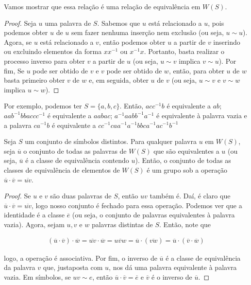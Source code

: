 	\par\vspace{0.3cm} Vamos mostrar que essa relação é uma relação de equivalência em $W(S)$.
	
	\begin{proof}
		Seja $u$ uma palavra de $S$. Sabemos que $u$ está relacionado a $u$, pois podemos obter $u$ de $u$ sem fazer nenhuma inserção nem exclusão (ou seja, $u\sim u$). Agora, se $u$ está relacionado a $v$, então podemos obter $u$ a partir de $v$ inserindo ou excluindo elementos da forma $xx^{-1}$ ou $x^{-1}x$. Portanto, basta realizar o processo inverso para obter $v$ a partir de $u$ (ou seja, $u\sim v$ implica $v\sim u$). Por fim, Se $u$ pode ser obtido de $v$ e $v$ pode ser obtido de $w$, então, para obter $u$ de $w$ basta primeiro obter $v$ de $w$ e, em seguida, obter $u$ de $v$ (ou seja, $u\sim v$ e $v\sim w$ implica $u\sim w$).
	\end{proof}
	
	\par\vspace{0.3cm} Por exemplo, podemos ter $S = \{a, b, c\}$. Então, $acc^{-1}b$ é equivalente  a $ab$; $aab^{-1}bbaccc^{-1}$ é equivalente a $aabac$; $a^{-1}aabb^{-1}a^{-1}$ é equivalente à palavra vazia e a palavra $ca^{-1}b$ é equivalente a $cc^{-1}caa^{-1}a^{-1}bbca^{-1}ac^{-1}b^{-1}$
	
	
	\begin{theorem}
		\label{grupo livre}
		Seja $S$ um conjunto de símbolos distintos. Para qualquer palavra $u$ em $W(S)$, seja $\overline{u}$ o conjunto de todas as palavras de $W(S)$ que são equivalentes a $u$ (ou seja, $\overline{u}$ é a classe de equivalência contendo $u$). Então, o conjunto de todas as classes de equivalência de elementos de $W(S)$ é um grupo sob a operação $\overline{u}\cdot\overline{v} = \overline{uv}$. 
	\end{theorem}
	
	\begin{proof}
		Se $u$ e $v$ são duas palavras de $S$, então $uv$ também é. Daí, é claro que $\overline{u}\cdot\overline{v} = \overline{uv}$, logo nosso conjunto é fechado para essa operação. Podemos ver que a identidade é a classe $\overline{e}$ (ou seja, o conjunto de palavras equivalentes à palavra vazia). Agora, sejam $u,v$ e $w$ palavras distintas de $S$. Então, note que 
		
		\begin{align*}
		(\overline{u}\cdot\overline{v})\cdot\overline{w} = \overline{uv}\cdot\overline{w} = \overline{uvw} = \overline{u}\cdot (\overline{vw}) = \overline{u}\cdot (\overline{v}\cdot\overline{w})
		\end{align*}
		
		\par\vspace{0.3cm} logo, a operação é associativa. Por fim, o inverso de $\overline{u}$ é a classe de equivalência da palavra $v$ que, justaposta com $u$, nos dá uma palavra equivalente à palavra vazia. Em símbolos, se $uv\sim e$, então $\overline{u}\cdot\overline{v} = \overline{e}$ e $\overline{v}$ é o inverso de $\overline{u}$.
		
	\end{proof}
	
